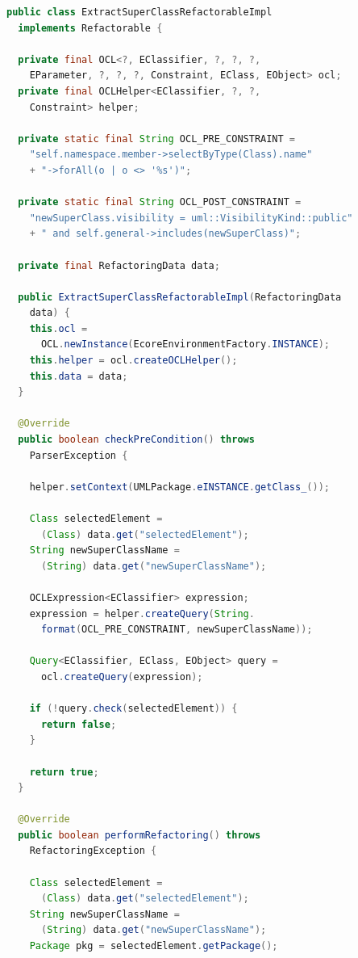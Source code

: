 \documentclass{llncs}
\begin{document}
\begin{lstlisting}[language=Java,caption=Source code of the \textit{extract superClass} refactoring,label=lst:extractSuperclass]
public class ExtractSuperClassRefactorableImpl 
  implements Refactorable {

  private final OCL<?, EClassifier, ?, ?, ?, 
    EParameter, ?, ?, ?, Constraint, EClass, EObject> ocl;
  private final OCLHelper<EClassifier, ?, ?, 
    Constraint> helper;

  private static final String OCL_PRE_CONSTRAINT =
    "self.namespace.member->selectByType(Class).name"
    + "->forAll(o | o <> '%s')";

  private static final String OCL_POST_CONSTRAINT = 
    "newSuperClass.visibility = uml::VisibilityKind::public"
    + " and self.general->includes(newSuperClass)";

  private final RefactoringData data;

  public ExtractSuperClassRefactorableImpl(RefactoringData 
    data) {
    this.ocl = 
      OCL.newInstance(EcoreEnvironmentFactory.INSTANCE);
    this.helper = ocl.createOCLHelper();
    this.data = data;
  }

  @Override
  public boolean checkPreCondition() throws 
    ParserException {
    
    helper.setContext(UMLPackage.eINSTANCE.getClass_());

    Class selectedElement = 
      (Class) data.get("selectedElement");
    String newSuperClassName = 
      (String) data.get("newSuperClassName");

    OCLExpression<EClassifier> expression;
    expression = helper.createQuery(String.
      format(OCL_PRE_CONSTRAINT, newSuperClassName));

    Query<EClassifier, EClass, EObject> query = 
      ocl.createQuery(expression);

    if (!query.check(selectedElement)) {
      return false;
    }

    return true;
  }

  @Override
  public boolean performRefactoring() throws 
    RefactoringException {
    
    Class selectedElement = 
      (Class) data.get("selectedElement");
    String newSuperClassName = 
      (String) data.get("newSuperClassName");
    Package pkg = selectedElement.getPackage();


\end{lstlisting}
\end{document}

